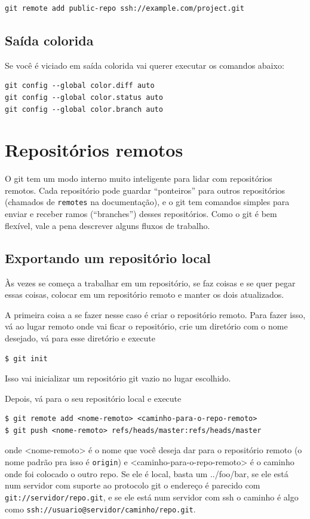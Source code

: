 \documentclass[12pt,brazil]{book}
\begin{document}
\begin{verbatim}
git remote add public-repo ssh://example.com/project.git
\end{verbatim}

\subsection{Saída colorida}
\label{sec:saida-colorida}

Se você é viciado em saída colorida vai querer executar os comandos abaixo:

\begin{verbatim}
git config --global color.diff auto
git config --global color.status auto
git config --global color.branch auto
\end{verbatim}

\section{Repositórios remotos}
\label{sec:remote}


O git tem um modo interno muito inteligente para lidar com
repositórios remotos. Cada repositório pode guardar ``ponteiros'' para
outros repositórios (chamados de \texttt{remotes} na documentação), e
o git tem comandos simples para enviar e receber ramos (``branches'')
desses repositórios. Como o git é bem flexível, vale a pena descrever
alguns fluxos de trabalho.

\subsection{Exportando um repositório local}
\label{sec:export-local}

Às vezes se começa a trabalhar em um repositório, se faz coisas e se
quer pegar essas coisas, colocar em um repositório remoto e manter os
dois atualizados.

A primeira coisa a se fazer nesse caso é criar o repositório
remoto. Para fazer isso, vá ao lugar remoto onde vai ficar o
repositório, crie um diretório com o nome desejado, vá para esse
diretório e execute
\begin{verbatim}
$ git init
\end{verbatim}
Isso vai inicializar um repositório git vazio no lugar escolhido.

Depois, vá para o seu repositório local e execute
\begin{verbatim}
$ git remote add <nome-remoto> <caminho-para-o-repo-remoto>
$ git push <nome-remoto> refs/heads/master:refs/heads/master
\end{verbatim}
onde <nome-remoto> é o nome que você deseja dar para o repositório
remoto (o nome padrão pra isso é \texttt{origin}) e
<caminho-para-o-repo-remoto> é o caminho onde foi colocado o outro
repo. Se ele é local, basta um ../foo/bar, se ele está num servidor
com suporte ao protocolo git o endereço é parecido com
\texttt{git://servidor/repo.git}, e se ele está num servidor com ssh o
caminho é algo como \texttt{ssh://usuario@servidor/caminho/repo.git}.
\end{document}
